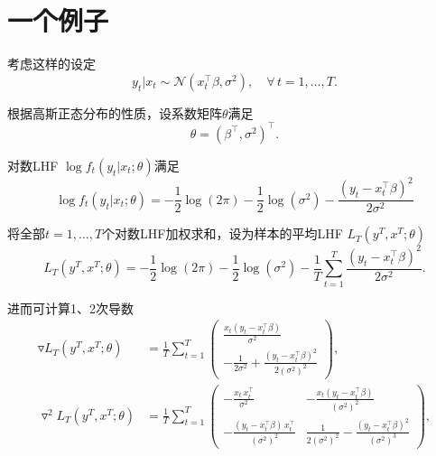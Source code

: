 \section{一个例子}
\label{sec:qmle-example}

考虑这样的设定
\begin{equation}
    \label{eq:qmle-example-setup}
    y_{t} | x_{t} \sim \mathcal{N} \left( x_{t}^{\top} \beta, \sigma^{2} \right), \quad \forall \, t = 1,\ldots, T.
\end{equation}

根据高斯正态分布的性质，设系数矩阵$\theta$满足
\begin{equation*}
    \theta = \left( \beta^{\top}, \sigma^{2} \right)^{\top}.
\end{equation*}

对数LHF $\log f_{t} \left( y_{t} | x_{t} ; \theta \right)$满足
\begin{equation*}
    \log f_{t} \left( y_{t} | x_{t} ; \theta \right)
    = -\frac{1}{2} \log \left( 2 \pi \right)
    - \frac{1}{2} \log \left( \sigma^{2} \right)
    - \frac{
    \left( y_{t} - x_{t}^{\top} \beta \right)^{2}
    }{
    2 \sigma^{2}
    }
\end{equation*}

将全部$t=1,\ldots,T$个对数LHF加权求和，设为样本的平均LHF $L_{T} \left(y^{T}, x^{T}; \theta \right)$
\begin{equation*}
    L_{T} \left(y^{T}, x^{T}; \theta \right)
    = -\frac{1}{2} \log \left( 2 \pi \right)
    - \frac{1}{2} \log \left( \sigma^{2} \right)
    - \frac{1}{T} \sum_{t=1}^{T}
    \frac{
    \left( y_{t} - x_{t}^{\top} \beta \right)^{2}
    }{
    2 \sigma^{2}
    }.
\end{equation*}

进而可计算1、2次导数
\begin{align}
    \label{eq:qmle-example-lhf-derivative-1}
    \triangledown L_{T} \left(y^{T}, x^{T}; \theta \right)
    & = \frac{1}{T} \sum_{t=1}^{T}
    \begin{pmatrix}
        \frac{
        x_{t} \left( y_{t} - x_{t}^{\top} \beta \right)
        }{
        \sigma^{2}
        } \\
        -\frac{1}{2 \sigma^{2}} + \frac{
        \left( y_{t} - x_{t}^{\top} \beta \right)^{2}
        }{
        2 \left( \sigma^{2} \right)^{2}
        }
    \end{pmatrix}, \\
    \label{eq:qmle-example-lhf-derivative-2}
    \triangledown^{2} L_{T} \left(y^{T}, x^{T}; \theta \right)
    & = \frac{1}{T} \sum_{t=1}^{T}
    \begin{pmatrix}
        - \frac{x_{t} \, x_{t}^{\top}}{\sigma^{2}} &
        - \frac{x_{t} \left( y_{t} - x_{t}^{\top} \beta \right)}{\left( \sigma^{2} \right)^{2}} \\
        - \frac{
        \left( y_{t} - x_{t}^{\top} \beta \right) \, x_{t}^{\top}
        }{
        \left( \sigma^{2} \right)^{2}
        } &
        \frac{
        1
        }{
        2 \left( \sigma^{2} \right)^{2}
        }
        - \frac{
        \left( y_{t} - x_{t}^{\top} \beta \right)^{2}
        }{
        \left( \sigma^{2} \right)^{3}
        }
    \end{pmatrix},
\end{align}

